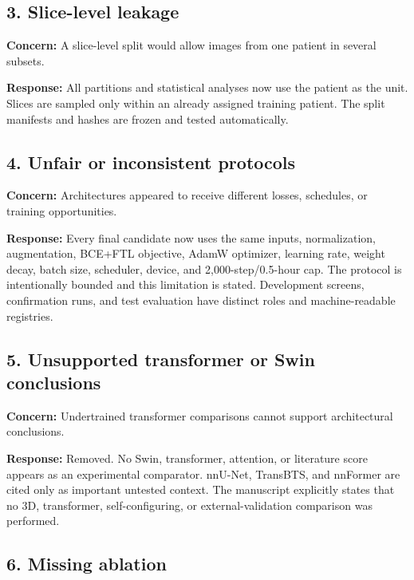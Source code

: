 \documentclass[
  10pt,
  letterpaper,
]{article}
\begin{document}
\subsection{3. Slice-level leakage}\label{slice-level-leakage}

\textbf{Concern:} A slice-level split would allow images from one
patient in several subsets.

\textbf{Response:} All partitions and statistical analyses now use the
patient as the unit. Slices are sampled only within an already assigned
training patient. The split manifests and hashes are frozen and tested
automatically.

\subsection{4. Unfair or inconsistent
protocols}\label{unfair-or-inconsistent-protocols}

\textbf{Concern:} Architectures appeared to receive different losses,
schedules, or training opportunities.

\textbf{Response:} Every final candidate now uses the same inputs,
normalization, augmentation, BCE+FTL objective, AdamW optimizer,
learning rate, weight decay, batch size, scheduler, device, and
2,000-step/0.5-hour cap. The protocol is intentionally bounded and this
limitation is stated. Development screens, confirmation runs, and test
evaluation have distinct roles and machine-readable registries.

\subsection{5. Unsupported transformer or Swin
conclusions}\label{unsupported-transformer-or-swin-conclusions}

\textbf{Concern:} Undertrained transformer comparisons cannot support
architectural conclusions.

\textbf{Response:} Removed. No Swin, transformer, attention, or
literature score appears as an experimental comparator. nnU-Net,
TransBTS, and nnFormer are cited only as important untested context. The
manuscript explicitly states that no 3D, transformer, self-configuring,
or external-validation comparison was performed.

\subsection{6. Missing ablation}\label{missing-ablation}
\end{document}
